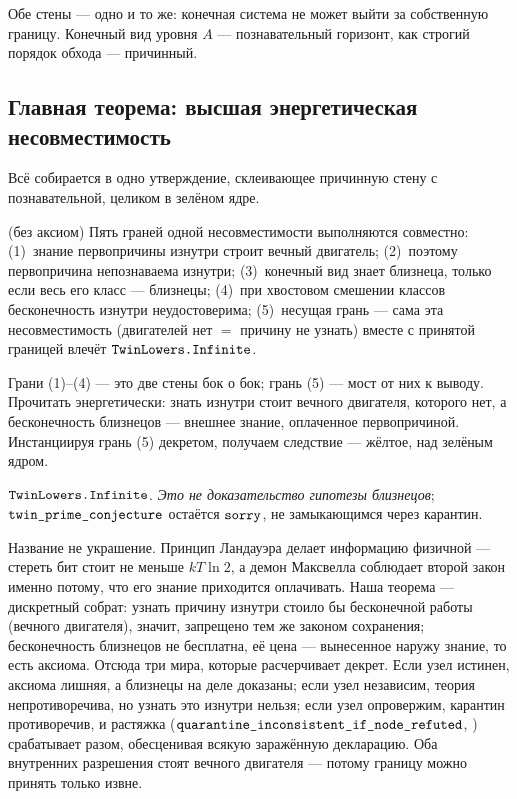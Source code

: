 Обе стены --- одно и то же: конечная система не может выйти за собственную границу. Конечный вид уровня
$A$ --- познавательный горизонт, как строгий порядок обхода --- причинный.

\subsection{Главная теорема: высшая энергетическая несовместимость}

Всё собирается в одно утверждение, склеивающее причинную стену с познавательной, целиком в зелёном
ядре.

\begin{theorem}\label{thm:higherEnergyIncompatibility_main}
\green{} (без аксиом) Пять граней одной несовместимости выполняются совместно:
(1)~знание первопричины изнутри строит вечный двигатель;
(2)~поэтому первопричина непознаваема изнутри;
(3)~конечный вид знает близнеца, только если весь его класс --- близнецы;
(4)~при хвостовом смешении классов бесконечность изнутри неудостоверима;
(5)~несущая грань --- сама эта несовместимость (двигателей нет $=$ причину не узнать) вместе с
принятой границей влечёт $\texttt{TwinLowers.Infinite}$.
\end{theorem}

Грани (1)--(4) --- это две стены бок о бок; грань (5) --- мост от них к выводу. Прочитать
энергетически: знать изнутри стоит вечного двигателя, которого нет, а бесконечность близнецов ---
внешнее знание, оплаченное первопричиной. Инстанциируя грань (5) декретом, получаем следствие ---
жёлтое, над зелёным ядром.

\begin{corollary}\label{thm:higherEnergyIncompatibility_twins}
\yellow{} $\texttt{TwinLowers.Infinite}$. \emph{Это не доказательство гипотезы близнецов};
$\texttt{twin\_prime\_conjecture}$ остаётся $\texttt{sorry}$, не замыкающимся через карантин.
\end{corollary}

\begin{remark}
Название не украшение. Принцип Ландауэра делает информацию физичной --- стереть бит стоит не меньше
$kT\ln 2$, а демон Максвелла соблюдает второй закон именно потому, что его знание приходится
оплачивать. Наша теорема --- дискретный собрат: узнать причину изнутри стоило бы бесконечной работы
(вечного двигателя), значит, запрещено тем же законом сохранения; бесконечность близнецов не
бесплатна, её цена --- вынесенное наружу знание, то есть аксиома. Отсюда три мира, которые
расчерчивает декрет. Если узел истинен, аксиома лишняя, а близнецы на деле доказаны; если узел
независим, теория непротиворечива, но узнать это изнутри нельзя; если узел опровержим, карантин
противоречив, и растяжка ($\texttt{quarantine\_inconsistent\_if\_node\_refuted}$, \yellow{}) срабатывает
разом, обесценивая всякую заражённую декларацию. Оба внутренних разрешения стоят вечного двигателя ---
потому границу можно принять только извне.
\end{remark}
